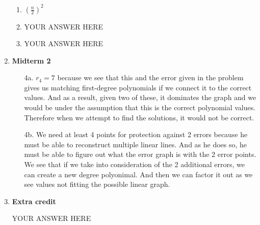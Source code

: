 \documentclass[12pt,fleqn]{article}
\begin{document}
\begin{enumerate}
  \begin{enumerate}
    \item 
	$(\frac{n}{2})^2$
    
    \item 
    YOUR ANSWER HERE
    
    \item 
    YOUR ANSWER HERE
      
  \end{enumerate}
  
  
  \newpage
  \item \textbf{Midterm 2}
 
 \begin{itemize}
 \item[4a.] $r_4 = 7$ because we see that this and the error given in the problem gives us matching first-degree polynomials if we connect it to the correct values. And as a result, given two of these, it dominates the graph and we would be under the assumption that this is the correct polynomial values. Therefore when we attempt to find the solutions, it would not be correct.
 
 \item[4b.] We need at least 4 points for protection against 2 errors because he must be able to reconstruct multiple linear lines. And as he does so, he must be able to figure out what the error graph is with the 2 error points. We see that if we take into consideration of the 2 additional errors, we can create a new degree polyonimal. And then we can factor it out as we see values not fitting the possible linear graph. 
 \end{itemize}
  
  
  
  \newpage
  \item \textbf{Extra credit}
  
  YOUR ANSWER HERE


\end{enumerate}
\end{document}

